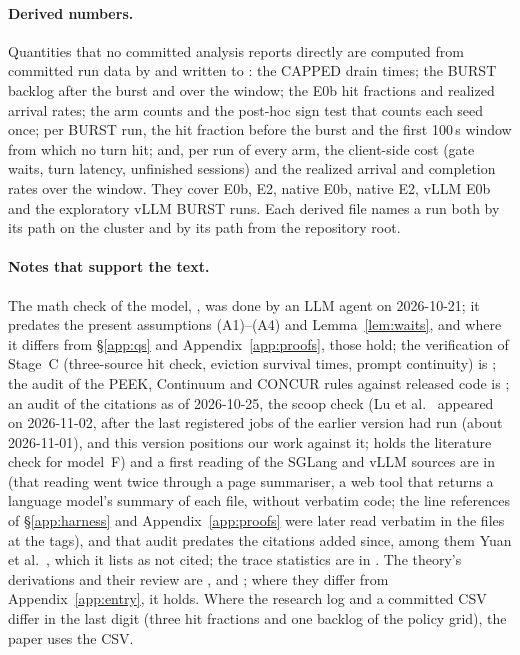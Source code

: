 \paragraph{Derived numbers.} Quantities that no committed analysis reports directly are computed from committed run data by  and written to : the CAPPED drain times; the BURST backlog after the burst and over the window; the E0b hit fractions and realized arrival rates; the arm counts and the post-hoc sign test that counts each seed once; per BURST run, the hit fraction before the burst and the first 100\,s window from which no turn hit; and, per run of every arm, the client-side cost (gate waits, turn latency, unfinished sessions) and the realized arrival and completion rates over the window. They cover E0b, E2, native E0b, native E2, vLLM E0b and the exploratory vLLM BURST runs. Each derived file names a run both by its path on the cluster and by its path from the repository root.

\paragraph{Notes that support the text.} The math check of the model, , was done by an LLM agent on 2026-10-21; it predates the present assumptions (A1)--(A4) and Lemma~\ref{lem:waits}, and where it differs from \S\ref{app:qs} and Appendix~\ref{app:proofs}, those hold; the verification of Stage~C (three-source hit check, eviction survival times, prompt continuity) is ; the audit of the PEEK, Continuum and CONCUR rules against released code is ; an audit of the citations as of 2026-10-25, the scoop check (Lu et al.~\citep{lu2026cachetrap} appeared on 2026-11-02, after the last registered jobs of the earlier version had run (about 2026-11-01), and this version positions our work against it;  holds the literature check for model~F) and a first reading of the SGLang and vLLM sources are in  (that reading went twice through a page summariser, a web tool that returns a language model's summary of each file, without verbatim code; the line references of \S\ref{app:harness} and Appendix~\ref{app:proofs} were later read verbatim in the files at the tags), and that audit predates the citations added since, among them Yuan et al.~\citep{yuan2026agentic}, which it lists as not cited; the trace statistics are in . The theory's derivations and their review are ,  and ; where they differ from Appendix~\ref{app:entry}, it holds. Where the research log and a committed CSV differ in the last digit (three hit fractions and one backlog of the policy grid), the paper uses the CSV.


